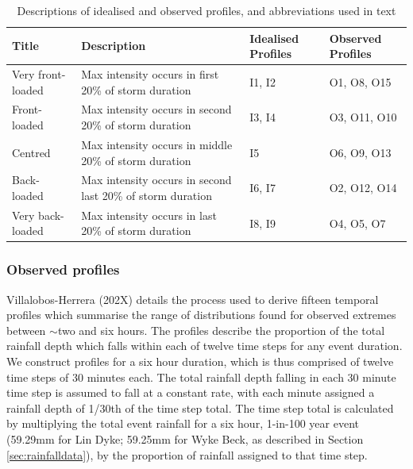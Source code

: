 \documentclass[APA,Times2COL]{WileyNJDv5}
\begin{document}
\begingroup
\setlength\tabcolsep{0pt}
\renewcommand{\arraystretch}{1.5} %
\begin{table}[h!]
\centering
\caption{Descriptions of idealised and observed profiles, and abbreviations used in text}
\begin{tabular}{C{3cm}C{8cm}C{3cm}C{3cm}} 
 \hline
 \textbf{Title} & \textbf{Description} & \textbf{Idealised Profiles} & \textbf{Observed Profiles} \\ [0.5ex] 
 \hline
 Very front-loaded & Max intensity occurs in first 20\% of storm duration & I1, I2 & O1, O8, O15\\
 Front-loaded & Max intensity occurs in second 20\% of storm duration & I3, I4 & O3, O11, O10 \\
 Centred & Max intensity occurs in middle 20\% of storm duration & I5 & O6, O9, O13\\
 Back-loaded & Max intensity occurs in second last 20\% of storm duration & I6, I7 & O2, O12, O14\\
 Very back-loaded & Max intensity occurs in last 20\% of storm duration & I8, I9 & O4, O5, O7\\[1ex] 
 \hline
\end{tabular}
\label{table:profile_names}
\end{table}
\endgroup

\subsubsection{Observed profiles}\label{subsubsec:observed}
Villalobos-Herrera (202X) details the process used to derive fifteen temporal profiles which summarise the range of distributions found for observed extremes between $\sim$two and six hours. The profiles describe the proportion of the total rainfall depth which falls within each of twelve time steps for any event duration. We construct profiles for a six hour duration, which is thus comprised of twelve time steps of 30 minutes each. The total rainfall depth falling in each 30 minute time step is assumed to fall at a constant rate, with each minute assigned a rainfall depth of 1/30th of the time step total. The time step total is calculated by multiplying the total event rainfall for a six hour, 1-in-100 year event (59.29mm for Lin Dyke; 59.25mm for Wyke Beck, as described in Section \ref{sec:rainfalldata}), by the proportion of rainfall assigned to that time step.  
\end{document}
